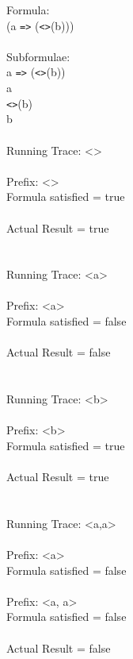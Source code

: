 Formula:\\
(a \texttt{=>} (\texttt{<>}(b)))\\
\\
Subformulae:\\
a \texttt{=>} (\texttt{<>}(b))\\
a\\
\texttt{<>}(b)\\
b\\
\\
Running Trace: \textless \textgreater\\
\\
  Prefix: \textless \textgreater\\
  Formula satisfied = true\\
\\
  Actual Result = true\\
\\
\\
Running Trace: \textless a\textgreater\\
\\
  Prefix: \textless a\textgreater\\
  Formula satisfied = false\\
\\
  Actual Result = false\\
\\
\\
Running Trace: \textless b\textgreater\\
\\
  Prefix: \textless b\textgreater\\
  Formula satisfied = true\\
\\
  Actual Result = true\\
\\
\\
Running Trace: \textless a,a\textgreater\\
\\
  Prefix: \textless a\textgreater\\
  Formula satisfied = false\\
\\
  Prefix: \textless a, a\textgreater\\
  Formula satisfied = false\\
\\
  Actual Result = false\\

\newpage

